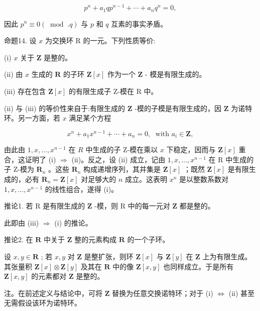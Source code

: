 \documentclass[10pt]{article}
\begin{document}
\[
{p}^{n} + {a}_{1}q{p}^{n - 1} + \cdots  + {a}_{n}{q}^{n} = 0,
\]

因此 \({p}^{n} \equiv  0\left( {{\;\operatorname{mod}\;.}q}\right)\) 与 \(p\) 和 \(q\) 互素的事实矛盾。

命题14. 设 \(x\) 为交换环 R 的一元。下列性质等价:

(i) \(x\) 关于 \(\mathbf{Z}\) 是整的。

(ii) 由 \(x\) 生成的 \(\mathbf{R}\) 的子环 \(\mathbf{Z}\left\lbrack  x\right\rbrack\) 作为一个 \(\mathbf{Z}\) - 模是有限生成的。

(iii) 存在包含 \(\mathbf{Z}\left\lbrack  x\right\rbrack\) 的有限生成子 Z-模在 \(\mathrm{R}\) 中。

(ii) 与 (iii) 的等价性来自于:有限生成的 \(\mathbf{Z}\) -模的子模是有限生成的，因 \(\mathbf{Z}\) 为诺特环。另一方面，若 \(x\) 满足某个方程

\[
{x}^{n} + {a}_{1}{x}^{n - 1} + \cdots  + {a}_{n} = 0,\;\text{ with }{a}_{i} \in  \mathbf{Z},
\]

由此由 \(1,x,\ldots ,{x}^{n - 1}\) 在 \(R\) 中生成的子 Z-模在乘以 \(x\) 下稳定，因而与 \(\mathbf{Z}\left\lbrack  x\right\rbrack\) 重合，这证明了 (i) \(\Rightarrow\) (ii)。反之，设 (ii) 成立，记由 \(1,x,\ldots ,{x}^{n - 1}\) 在 R 中生成的子 Z-模为 \({\mathbf{R}}_{n}\) 。这些 \({\mathbf{R}}_{n}\) 构成递增序列，其并集是 \(\mathbf{Z}\left\lbrack  x\right\rbrack\) ；既然 \(\mathbf{Z}\left\lbrack  x\right\rbrack\) 是有限生成的，必有 \({\mathbf{R}}_{n} = \mathbf{Z}\left\lbrack  x\right\rbrack\) 对足够大的 \(n\) 成立。这表明 \({x}^{n}\) 是以整数系数对 \(1,x,\ldots ,{x}^{n - 1}\) 的线性组合，遂得 (i)。

推论1. 若 \(\mathrm{R}\) 是有限生成的 \(\mathbf{Z}\) -模，则 \(\mathrm{R}\) 中的每一元对 \(\mathbf{Z}\) 都是整的。

此即由 (iii) \(\Rightarrow\) (i) 的推论。

推论2. 在 \(\mathbf{R}\) 中关于 \(\mathbf{Z}\) 整的元素构成 \(\mathbf{R}\) 的一个子环。

设 \(x,y \in  \mathbf{R}\) ; 若 \(x,y\) 对 \(\mathbf{Z}\) 是整扩张，则环 \(\mathbf{Z}\left\lbrack  x\right\rbrack\) 与 \(\mathbf{Z}\left\lbrack  y\right\rbrack\) 在 \(\mathbf{Z}\) 上为有限生成。其张量积 \(\mathbf{Z}\left\lbrack  x\right\rbrack   \otimes  \mathbf{Z}\left\lbrack  y\right\rbrack\) 及其在 \(\mathbf{R}\) 中的像 \(\mathbf{Z}\left\lbrack  {x,y}\right\rbrack\) 也同样成立。于是所有 \(\mathbf{Z}\left\lbrack  {x,y}\right\rbrack\) 的元素都对 \(\mathbf{Z}\) 是整的。

注。在前述定义与结论中，可将 \(\mathbf{Z}\) 替换为任意交换诺特环；对于 (i) \(\Leftrightarrow\) (ii) 甚至无需假设该环为诺特环。
\end{document}
